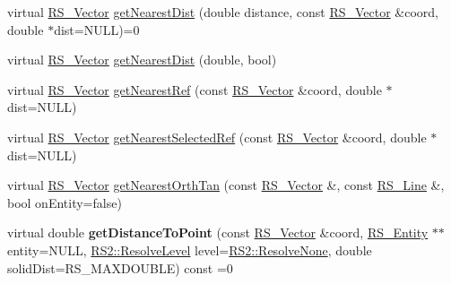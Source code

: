 \begin{DoxyCompactItemize}
\item 
virtual \hyperlink{classRS__Vector}{R\-S\-\_\-\-Vector} \hyperlink{classRS__Entity_a73cedae7d3f54292d8be43e4d9f6fb4d}{get\-Nearest\-Dist} (double distance, const \hyperlink{classRS__Vector}{R\-S\-\_\-\-Vector} \&coord, double $\ast$dist=N\-U\-L\-L)=0
\item 
virtual \hyperlink{classRS__Vector}{R\-S\-\_\-\-Vector} \hyperlink{classRS__Entity_a1879785bfb719572b8760378cb3717fc}{get\-Nearest\-Dist} (double, bool)
\item 
virtual \hyperlink{classRS__Vector}{R\-S\-\_\-\-Vector} \hyperlink{classRS__Entity_a89d39a2eba218cd0142744f88e3af112}{get\-Nearest\-Ref} (const \hyperlink{classRS__Vector}{R\-S\-\_\-\-Vector} \&coord, double $\ast$dist=N\-U\-L\-L)
\item 
virtual \hyperlink{classRS__Vector}{R\-S\-\_\-\-Vector} \hyperlink{classRS__Entity_af940ae16da3de4872eafefe792ece20e}{get\-Nearest\-Selected\-Ref} (const \hyperlink{classRS__Vector}{R\-S\-\_\-\-Vector} \&coord, double $\ast$dist=N\-U\-L\-L)
\item 
virtual \hyperlink{classRS__Vector}{R\-S\-\_\-\-Vector} \hyperlink{classRS__Entity_a6c075ad4f89ac6d70327b86fdd52100a}{get\-Nearest\-Orth\-Tan} (const \hyperlink{classRS__Vector}{R\-S\-\_\-\-Vector} \&, const \hyperlink{classRS__Line}{R\-S\-\_\-\-Line} \&, bool on\-Entity=false)
\item 
\hypertarget{classRS__Entity_a9d88396a264217954bf0df8c10e95c40}{virtual double {\bfseries get\-Distance\-To\-Point} (const \hyperlink{classRS__Vector}{R\-S\-\_\-\-Vector} \&coord, \hyperlink{classRS__Entity}{R\-S\-\_\-\-Entity} $\ast$$\ast$entity=N\-U\-L\-L, \hyperlink{classRS2_a1b2c5e3a3e9d1b03a9564229255faa20}{R\-S2\-::\-Resolve\-Level} level=\hyperlink{classRS2_a1b2c5e3a3e9d1b03a9564229255faa20aecb7396f39bc313ad8903c8a5fac5a50}{R\-S2\-::\-Resolve\-None}, double solid\-Dist=R\-S\-\_\-\-M\-A\-X\-D\-O\-U\-B\-L\-E) const =0}\label{classRS__Entity_a9d88396a264217954bf0df8c10e95c40}


\end{DoxyCompactItemize}
